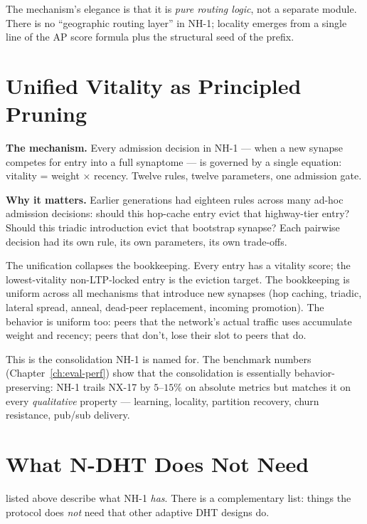 \documentclass[twoside,nobib]{tufte-book}
\newcommand{\NDHT}{N-DHT\xspace}
\begin{document}
The mechanism's elegance is that it is \emph{pure routing
logic}, not a separate module. There is no
``geographic routing layer'' in NH-1; locality emerges from a
single line of the AP score formula plus the structural seed of
the prefix.

\section{Unified Vitality as Principled Pruning}

\textbf{The mechanism.} Every admission decision in NH-1 ---
when a new synapse competes for entry into a full synaptome ---
is governed by a single equation: vitality = weight × recency.
Twelve rules, twelve parameters, one admission gate.

\textbf{Why it matters.} Earlier generations had eighteen rules
across many ad-hoc admission decisions: should this hop-cache
entry evict that highway-tier entry? Should this triadic
introduction evict that bootstrap synapse? Each pairwise
decision had its own rule, its own parameters, its own
trade-offs.

The unification collapses the bookkeeping. Every entry has a
vitality score; the lowest-vitality non-LTP-locked entry is
the eviction target. The bookkeeping is uniform across all
mechanisms that introduce new synapses (hop caching, triadic,
lateral spread, anneal, dead-peer replacement, incoming
promotion). The behavior is uniform too: peers that the
network's actual traffic uses accumulate weight and recency;
peers that don't, lose their slot to peers that do.

This is the consolidation NH-1 is named for. The benchmark
numbers (Chapter~\ref{ch:eval-perf}) show that the consolidation
is essentially behavior-preserving: NH-1 trails NX-17 by
$5$--$15\%$ on absolute metrics but matches it on every
\emph{qualitative} property --- learning, locality, partition
recovery, churn resistance, pub/sub delivery.

\section{What \NDHT Does Not Need}

 listed above describe
what NH-1 \emph{has}. There is a complementary list: things the
protocol does \emph{not} need that other adaptive DHT designs
do.
\end{document}
